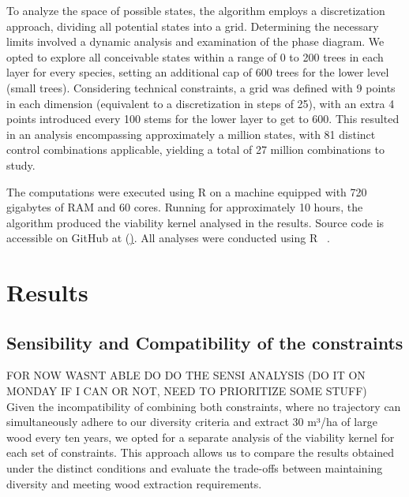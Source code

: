 \documentclass{article}
\begin{document}
To analyze the space of possible states, the algorithm employs a discretization approach, dividing all potential states into a grid. Determining the necessary limits involved a dynamic analysis and examination of the phase diagram. We opted to explore all conceivable states within a range of 0 to 200 trees in each layer for every species, setting an additional cap of 600 trees for the lower level (small trees). Considering technical constraints, a grid was defined with 9 points in each dimension (equivalent to a discretization in steps of 25), with an extra 4 points introduced every 100 stems for the lower layer to get to 600. This resulted in an analysis encompassing approximately a million states, with 81 distinct control combinations applicable, yielding a total of 27 million combinations to study.

The computations were executed using R on a machine equipped with 720 gigabytes of RAM and 60 cores. Running for approximately 10 hours, the algorithm produced the viability kernel analysed in the results. Source code is accessible on GitHub at (\href{https://github.com/clem9123/Forest_management_and_viability}). All analyses were conducted using R ~\autocite{Rsoftware}.

\section{Results}

\subsection{Sensibility and Compatibility of the constraints}


FOR NOW WASNT ABLE DO DO THE SENSI ANALYSIS (DO IT ON MONDAY IF I CAN OR NOT, NEED TO PRIORITIZE SOME STUFF)\\

Given the incompatibility of combining both constraints, where no trajectory can simultaneously adhere to our diversity criteria and extract 30 m³/ha of large wood every ten years, we opted for a separate analysis of the viability kernel for each set of constraints. This approach allows us to compare the results obtained under the distinct conditions and evaluate the trade-offs between maintaining diversity and meeting wood extraction requirements.
\end{document}
